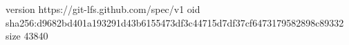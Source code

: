version https://git-lfs.github.com/spec/v1
oid sha256:d9682bd401a193291d43b6155473df3c44715d7df37cf6473179582898c89332
size 43840
